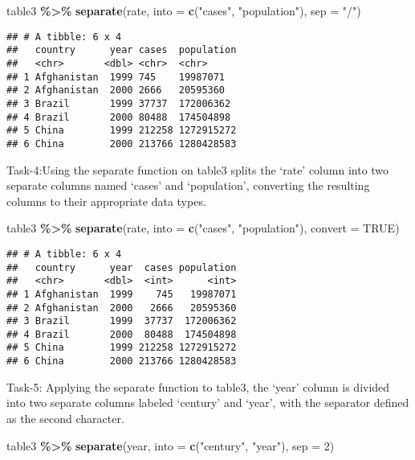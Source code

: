 \documentclass[
]{article}
\newenvironment{Shaded}{\begin{snugshade}}{\end{snugshade}}
\newcommand{\AttributeTok}[1]{\textcolor[rgb]{0.13,0.29,0.53}{#1}}
\newcommand{\ConstantTok}[1]{\textcolor[rgb]{0.56,0.35,0.01}{#1}}
\newcommand{\DecValTok}[1]{\textcolor[rgb]{0.00,0.00,0.81}{#1}}
\newcommand{\FunctionTok}[1]{\textcolor[rgb]{0.13,0.29,0.53}{\textbf{#1}}}
\newcommand{\NormalTok}[1]{#1}
\newcommand{\SpecialCharTok}[1]{\textcolor[rgb]{0.81,0.36,0.00}{\textbf{#1}}}
\newcommand{\StringTok}[1]{\textcolor[rgb]{0.31,0.60,0.02}{#1}}
\begin{document}
\begin{Shaded}
\begin{Highlighting}[]
\NormalTok{table3 }\SpecialCharTok{\%\textgreater{}\%} 
  \FunctionTok{separate}\NormalTok{(rate, }\AttributeTok{into =} \FunctionTok{c}\NormalTok{(}\StringTok{"cases"}\NormalTok{, }\StringTok{"population"}\NormalTok{), }\AttributeTok{sep =} \StringTok{"/"}\NormalTok{)}
\end{Highlighting}
\end{Shaded}

\begin{verbatim}
## # A tibble: 6 x 4
##   country      year cases  population
##   <chr>       <dbl> <chr>  <chr>     
## 1 Afghanistan  1999 745    19987071  
## 2 Afghanistan  2000 2666   20595360  
## 3 Brazil       1999 37737  172006362 
## 4 Brazil       2000 80488  174504898 
## 5 China        1999 212258 1272915272
## 6 China        2000 213766 1280428583
\end{verbatim}

Task-4:Using the separate function on table3 splits the `rate' column
into two separate columns named `cases' and `population', converting the
resulting columns to their appropriate data types.

\begin{Shaded}
\begin{Highlighting}[]
\NormalTok{table3 }\SpecialCharTok{\%\textgreater{}\%} 
  \FunctionTok{separate}\NormalTok{(rate, }\AttributeTok{into =} \FunctionTok{c}\NormalTok{(}\StringTok{"cases"}\NormalTok{, }\StringTok{"population"}\NormalTok{), }\AttributeTok{convert =} \ConstantTok{TRUE}\NormalTok{)}
\end{Highlighting}
\end{Shaded}

\begin{verbatim}
## # A tibble: 6 x 4
##   country      year  cases population
##   <chr>       <dbl>  <int>      <int>
## 1 Afghanistan  1999    745   19987071
## 2 Afghanistan  2000   2666   20595360
## 3 Brazil       1999  37737  172006362
## 4 Brazil       2000  80488  174504898
## 5 China        1999 212258 1272915272
## 6 China        2000 213766 1280428583
\end{verbatim}

Task-5: Applying the separate function to table3, the `year' column is
divided into two separate columns labeled `century' and `year', with the
separator defined as the second character.

\begin{Shaded}
\begin{Highlighting}[]
\NormalTok{table3 }\SpecialCharTok{\%\textgreater{}\%} 
  \FunctionTok{separate}\NormalTok{(year, }\AttributeTok{into =} \FunctionTok{c}\NormalTok{(}\StringTok{"century"}\NormalTok{, }\StringTok{"year"}\NormalTok{), }\AttributeTok{sep =} \DecValTok{2}\NormalTok{)}
\end{Highlighting}
\end{Shaded}
\end{document}
